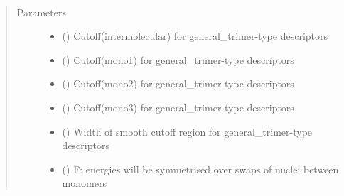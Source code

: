 \documentclass[letterpaper,10pt,english]{sphinxmanual}
\begin{document}
\begin{fulllineitems}
\label{\detokenize{descriptors:gap.descriptors.general_trimer}}~\begin{quote}\begin{description}
\item[{Parameters}] \leavevmode\begin{itemize}
\item {} 
 () \textendash{} Cutoff(intermolecular) for general\_trimer-type descriptors

\item {} 
 () \textendash{} Cutoff(mono1) for general\_trimer-type descriptors

\item {} 
 () \textendash{} Cutoff(mono2) for general\_trimer-type descriptors

\item {} 
 () \textendash{} Cutoff(mono3) for general\_trimer-type descriptors

\item {} 
 () \textendash{} Width of smooth cutoff region for general\_trimer-type descriptors

\item {} 
 () \textendash{} F: energies will be symmetrised over swaps of nuclei between monomers


\end{itemize}
\end{description}
\end{quote}
\end{fulllineitems}
\end{document}

